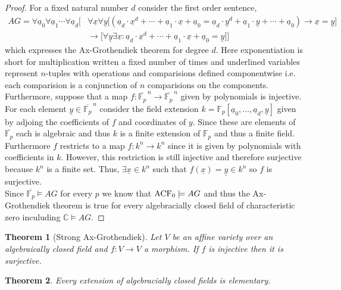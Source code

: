 \documentclass[12pt]{article}
\newcommand{\C}{\mathbb{C}}
\newcommand{\finfield}[1]{\mathbb{F}_{#1}}
\newcommand{\entails}{\models}
\newcommand{\ul}[1]{\underline{#1}}
\theoremstyle{theorem}
\newtheorem{theorem}{Theorem}[section]
\theoremstyle{definition}
\theoremstyle{definition}
\theoremstyle{remark}
\theoremstyle{definition}
\theoremstyle{remark}
\begin{document}
\begin{proof}
For a fixed natural number $d$ consider the first order sentence,
\begin{align*}
AG = \forall \ul{a}_0 \forall \ul{a}_1 \cdots \forall \ul{a}_d \bigg[ &  \forall \ul{x} \forall \ul{y} \Big[ \left( \ul{a}_d \cdot \ul{x}^d + \cdots + \ul{a}_1 \cdot \ul{x} + \ul{a}_0 = \ul{a}_d \cdot \ul{y}^d + \ul{a}_1 \cdot \ul{y} + \cdots + \ul{a}_0 \right) \to \ul{x} = \ul{y} \Big]
\\
&\to \Big[ \forall \ul{y} \exists \ul{x} : \ul{a}_d \cdot \ul{x}^d + \cdots + \ul{a}_1 \cdot \ul{x} + \ul{a}_0 = \ul{y}  \Big] \bigg]
\end{align*}
which expresses the Ax-Grothendiek theorem for degree $d$. Here exponentiation is short for multiplication written a fixed number of times and underlined variables represent $n$-tuples with operations and comparisions defined componentwise i.e. each comparision is a conjunction of $n$ comparisions on the components. Furthermore, suppose that a map $f : \overline{\finfield{p}}^{\,n} \to \overline{\finfield{p}}^{\,n}$ given by polynomials is injective. For each element $\ul{y} \in \overline{\finfield{p}}^{\,n}$ consider the field extension $k = \finfield{p}[\ul{a}_0, \dots, \ul{a}_d, \ul{y}]$ given by adjoing the coefficients of $f$ and coordinates of $y$. Since these are elements of $\overline{\finfield{p}}$ each is algebraic and thus $k$ is a finite extension of $\finfield{p}$ and thus a finite field. Furthermore $f$ restricts to a map $f : k^n \to k^n$ since it is given by polynomials with coefficients in $k$. However, this restriction is still injective and therefore surjective because $k^n$ is a finite set. Thus, $\exists \ul{x} \in k^n$ such that $f(\ul{x}) = \ul{y} \in k^n$ so $f$ is surjective. 
\bigskip\\
Since $\overline{\finfield{p}} \entails AG$ for every $p$ we know that $\ACF{0} \entails AG$ and thus the Ax-Grothendiek theorem is true for every algebracially closed field of characteristic zero inculuding $\C \entails AG$. 
\end{proof}

\begin{theorem}[Strong Ax-Grothendiek]
Let $V$ be an affine variety over an algebraically closed field and $f : V \to V$ a morphism. If $f$ is injective then it is surjective. 
\end{theorem}

\begin{theorem}
Every extension of algebracially closed fields is elementary.
\end{theorem}
\end{document}
